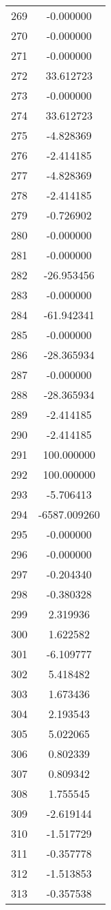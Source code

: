 \documentclass[12pt]{article}
\begin{document}
\begin{longtable}{@{}cc@{}}
269 & -0.000000 \\
270 & -0.000000 \\
271 & -0.000000 \\
272 & 33.612723 \\
273 & -0.000000 \\
274 & 33.612723 \\
275 & -4.828369 \\
276 & -2.414185 \\
277 & -4.828369 \\
278 & -2.414185 \\
279 & -0.726902 \\
280 & -0.000000 \\
281 & -0.000000 \\
282 & -26.953456 \\
283 & -0.000000 \\
284 & -61.942341 \\
285 & -0.000000 \\
286 & -28.365934 \\
287 & -0.000000 \\
288 & -28.365934 \\
289 & -2.414185 \\
290 & -2.414185 \\
291 & 100.000000 \\
292 & 100.000000 \\
293 & -5.706413 \\
294 & -6587.009260 \\
295 & -0.000000 \\
296 & -0.000000 \\
297 & -0.204340 \\
298 & -0.380328 \\
299 & 2.319936 \\
300 & 1.622582 \\
301 & -6.109777 \\
302 & 5.418482 \\
303 & 1.673436 \\
304 & 2.193543 \\
305 & 5.022065 \\
306 & 0.802339 \\
307 & 0.809342 \\
308 & 1.755545 \\
309 & -2.619144 \\
310 & -1.517729 \\
311 & -0.357778 \\
312 & -1.513853 \\
313 & -0.357538 \\

\end{longtable}
\end{document}
